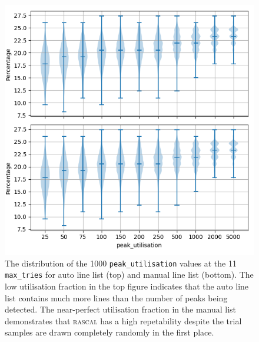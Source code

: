 \documentclass{aa}
\begin{document}
\begin{figure}[h]
    \centering
    \includegraphics[width=\columnwidth]{figure_4_peak_utilisation.png}
    \caption{The distribution of the 1000 \texttt{peak\_utilisation} values at the 11 \texttt{max\_tries} for auto line list (top) and manual line list (bottom). The low utilisation fraction in the top figure indicates that the auto line list contains much more lines than the number of peaks being detected. The near-perfect utilisation fraction in the manual list demonstrates that \textsc{rascal} has a high repetability despite the trial samples are drawn completely randomly in the first place.}
    \label{fig:peak_utilisation}
\end{figure}
\end{document}
